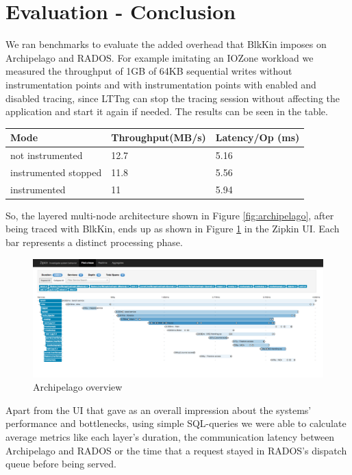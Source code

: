 \documentclass[a4paper,10pt,twocolumn]{article}
\begin{document}
\section{Evaluation - Conclusion} 

We ran benchmarks to evaluate the added overhead that BlkKin imposes on
Archipelago and RADOS. For example imitating an IOZone workload we measured the
throughput of 1GB of 64KB sequential writes without instrumentation points and
with instrumentation points with enabled and disabled tracing, since LTTng can
stop the tracing session without affecting the application and start it again if
needed. The results can be seen in the table.

\begin{center}
\begin{tabular}{| l | p{3cm} | p{2cm} |}
    \hline
    Mode & Throughput(MB/s) & Latency/Op (ms)  \\ \hline
    not instrumented & 12.7 & 5.16  \\ \hline
    instrumented stopped & 11.8 &  5.56  \\ \hline
    instrumented & 11 & 5.94  \\ 
    \hline
    \end{tabular}
\end{center}

So, the layered multi-node architecture shown in Figure \ref{fig:archipelago},
after being traced with BlkKin, ends up as shown in Figure \ref{fig:zipkin} in
the Zipkin UI. Each bar represents a distinct processing phase.

\begin{figure}[h!]
  \centering
  \includegraphics[scale=0.15]{images/zipkin.png}
  \caption{Archipelago overview}
  \label{fig:zipkin}
\end{figure}

Apart from the UI that gave as an overall impression about the systems'
performance and bottlenecks, using simple SQL-queries we were able to calculate
average metrics like each layer's duration, the communication latency between
Archipelago and RADOS or the time that a request stayed in RADOS's dispatch
queue before being served.   
\end{document}
